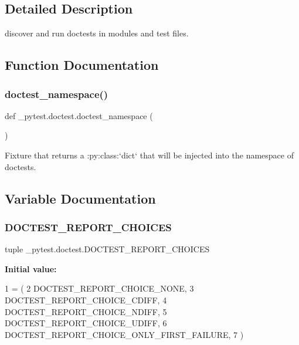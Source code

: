 \subsection{Detailed Description}
\begin{DoxyVerb}discover and run doctests in modules and test files.\end{DoxyVerb}
 

\subsection{Function Documentation}
\mbox{\label{namespace__pytest_1_1doctest_a6a8633c7d28b7ed28a31a5d5bf17c361}} 
\subsubsection{\texorpdfstring{doctest\+\_\+namespace()}{doctest\_namespace()}}
{\footnotesize\ttfamily def \+\_\+pytest.\+doctest.\+doctest\+\_\+namespace (\begin{DoxyParamCaption}{ }\end{DoxyParamCaption})}

\begin{DoxyVerb}Fixture that returns a :py:class:`dict` that will be injected into the namespace of doctests.
\end{DoxyVerb}
 

\subsection{Variable Documentation}
\mbox{\label{namespace__pytest_1_1doctest_a3274e554824e0537bd409379fa596e3b}} 
\subsubsection{\texorpdfstring{D\+O\+C\+T\+E\+S\+T\+\_\+\+R\+E\+P\+O\+R\+T\+\_\+\+C\+H\+O\+I\+C\+ES}{DOCTEST\_REPORT\_CHOICES}}
{\footnotesize\ttfamily tuple \+\_\+pytest.\+doctest.\+D\+O\+C\+T\+E\+S\+T\+\_\+\+R\+E\+P\+O\+R\+T\+\_\+\+C\+H\+O\+I\+C\+ES}

{\bfseries Initial value\+:}
\begin{DoxyCode}
1 =  (
2     DOCTEST\_REPORT\_CHOICE\_NONE,
3     DOCTEST\_REPORT\_CHOICE\_CDIFF,
4     DOCTEST\_REPORT\_CHOICE\_NDIFF,
5     DOCTEST\_REPORT\_CHOICE\_UDIFF,
6     DOCTEST\_REPORT\_CHOICE\_ONLY\_FIRST\_FAILURE,
7 )
\end{DoxyCode}
